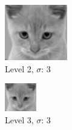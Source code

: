 \documentclass{article}
\begin{document}
\begin{minipage}{\linewidth}
    \centering
    \begin{minipage}{0.45\linewidth}
        \begin{figure}[H]
            \includegraphics[width=\linewidth]{Ejercicio2d/cat2.png}          
			\caption{Level 2, $\sigma$: 3}
        \end{figure}
    \end{minipage}
    \hspace{0.05\linewidth}
    \begin{minipage}{0.45\linewidth}
        \begin{figure}[H]
            \includegraphics[width=\linewidth]{Ejercicio2d/cat3.png}          
			\caption{Level 3, $\sigma$: 3}
        \end{figure}
    \end{minipage}   
    

\end{minipage}
\end{document}
